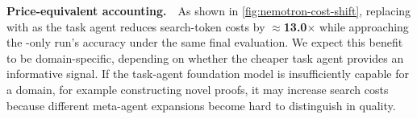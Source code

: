 \noindent\textbf{Price-equivalent accounting.}~~As shown in \cref{fig:nemotron-cost-shift}, replacing \gptlow with \nemotronultra as the task agent reduces search-token costs by $\approx$\textbf{13.0}$\boldsymbol{\times}$ while approaching the \gptlow-only run's accuracy under the same final evaluation. We expect this benefit to be domain-specific, depending on whether the cheaper task agent provides an informative signal. If the task-agent foundation model is insufficiently capable for a domain, for example constructing novel proofs, it may increase search costs because different meta-agent expansions become hard to distinguish in quality.
\vspace{-0.17cm}
\clearpage